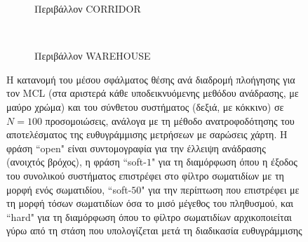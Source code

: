 \begin{figure}
  \vspace{2cm}
  \begin{subfigure}{\linewidth}
  \hspace{-1.25cm}
    
    \vspace{0.3cm}
    \caption{\small Περιβάλλον CORRIDOR}
    \label{}
  \end{subfigure}\\
  \begin{subfigure}{\linewidth}\vspace{0.5cm}
    \hspace{-1.25cm}
    
    \vspace{0.3cm}
    \caption{\small Περιβάλλον WAREHOUSE}
    \label{}
    \end{subfigure}
\caption{\small Η κατανομή του μέσου σφάλματος θέσης ανά διαδρομή πλοήγησης
         για τον MCL (στα αριστερά κάθε υποδεικνυόμενης μεθόδου ανάδρασης, με
         μαύρο χρώμα) και του σύνθετου συστήματος (δεξιά, με κόκκινο) σε
         $N=100$ προσομοιώσεις, ανάλογα με τη μέθοδο ανατροφοδότησης του
         αποτελέσματος της ευθυγράμμισης μετρήσεων με σαρώσεις χάρτη. Η φράση
         ``open" είναι συντομογραφία για την έλλειψη ανάδρασης (ανοιχτός
         βρόχος), η φράση ``soft-$1$" για τη διαμόρφωση όπου η έξοδος του
         συνολικού συστήματος επιστρέφει στο φίλτρο σωματιδίων με τη μορφή ενός
         σωματιδίου, ``soft-$50$" για την περίπτωση που επιστρέφει με τη μορφή
         τόσων σωματιδίων όσα το μισό μέγεθος του πληθυσμού, και ``hard" για τη
         διαμόρφωση όπου το φίλτρο σωματιδίων αρχικοποιείται γύρω από τη στάση
         που υπολογίζεται μετά τη διαδικασία ευθυγράμμισης}
\label{fig:02_02_04:feedbacks_position_zoomed}
\end{figure}
